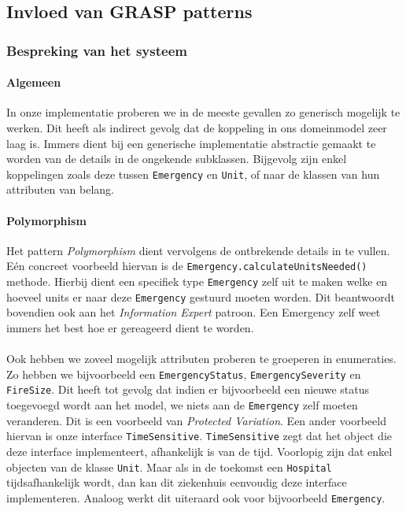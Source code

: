 \label{patterns}
\subsection{Invloed van GRASP patterns}
\label{grasppatterns}
\subsubsection{Bespreking van het systeem}
\paragraph{Algemeen}
In onze implementatie proberen we in de meeste gevallen zo generisch mogelijk te werken. Dit heeft als indirect gevolg dat de koppeling in ons domeinmodel zeer laag is. Immers dient bij een generische implementatie abstractie gemaakt te worden van de details in de ongekende subklassen. Bijgevolg zijn enkel koppelingen zoals deze tussen \texttt{Emergency} en \texttt{Unit}, of naar de klassen van hun attributen van belang.
\paragraph{Polymorphism}
Het pattern \textit{Polymorphism} dient vervolgens de ontbrekende details in te vullen. E\'en concreet voorbeeld hiervan is de \texttt{Emergency.calculateUnitsNeeded()} methode. Hierbij dient een specifiek type \texttt{Emergency} zelf uit te maken welke en hoeveel units er naar deze \texttt{Emergency} gestuurd moeten worden. Dit beantwoordt bovendien ook aan het \textit{Information Expert} patroon. Een Emergency zelf weet immers het best hoe er gereageerd dient te worden.
\paragraph{}
Ook hebben we zoveel mogelijk attributen proberen te groeperen in enumeraties. Zo hebben we bijvoorbeeld een \texttt{EmergencyStatus}, \texttt{EmergencySeverity} en \texttt{FireSize}. Dit heeft tot gevolg dat indien er bijvoorbeeld een nieuwe status toegevoegd wordt aan het model, we niets aan de \texttt{Emergency} zelf moeten veranderen. Dit is een voorbeeld van \textit{Protected Variation}. Een ander voorbeeld hiervan is onze interface \texttt{TimeSensitive}. \texttt{TimeSensitive} zegt dat het object die deze interface implementeert, afhankelijk is van de tijd. Voorlopig zijn dat enkel objecten van de klasse \texttt{Unit}. Maar als in de toekomst een \texttt{Hospital} tijdsafhankelijk wordt, dan kan dit ziekenhuis eenvoudig deze interface implementeren. Analoog werkt dit uiteraard ook voor bijvoorbeeld \texttt{Emergency}.
